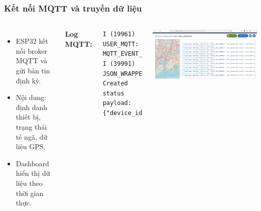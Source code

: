 \begin{frame}[t,fragile]
\frametitle{Kết nối MQTT và truyền dữ liệu}
\begin{columns}[T]
    \begin{itemize}
        \item ESP32 kết nối broker MQTT và gửi bản tin định kỳ.
        \item Nội dung: định danh thiết bị, trạng thái té ngã, dữ liệu GPS.
        \item Dashboard hiển thị dữ liệu theo thời gian thực.
    \end{itemize}
    \vspace{0.2cm}
    \textbf{Log MQTT:}
    \begin{verbatim}
I (19961) USER_MQTT: MQTT_EVENT_CONNECTED
I (39991) JSON_WRAPPER: Created status payload:
{"device_id":"ESP32_DEV_76E48B","fall_detected":false}
    \end{verbatim}

    \centering
    \includegraphics[width=\linewidth]{images/json_data_dashboard.png}
\end{columns}
\end{frame}

